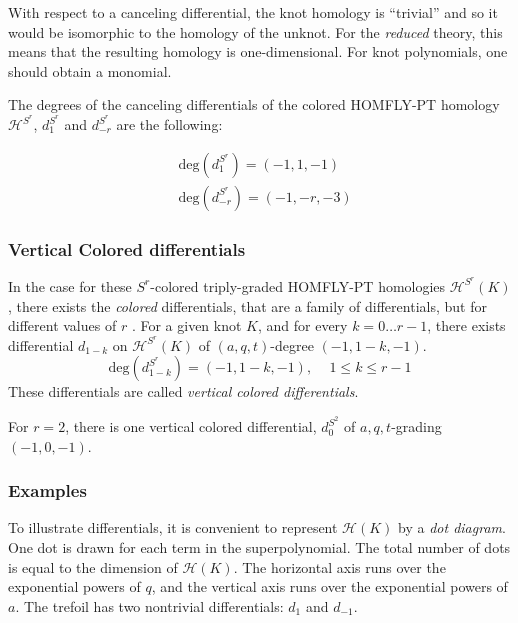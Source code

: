 \documentclass[a4paper,titlepage,twoside]{book}
\begin{document}
With respect to a canceling differential, the knot homology  is ``trivial'' and so it would be isomorphic to the homology of the unknot.  For the \emph{reduced} theory, this means that the resulting homology is one-dimensional.  For knot polynomials, one should obtain a monomial.

The degrees of the canceling differentials of the colored HOMFLY-PT homology $\mathcal{H}^{S^r}$, $d_1^{S^r}$ and $d^{S^r}_{-r}$ are the following:

\[
\begin{aligned}
  & \text{deg}{ (d_1^{S^r}) } = ( -1, 1, -1 ) \\ 
  & \text{deg}{ (d_{-r}^{S^r} ) } = (-1,-r,-3)
\end{aligned}
\]



\subsubsection{Vertical Colored differentials}

In the case for these $S^r$-colored triply-graded HOMFLY-PT homologies $\mathcal{H}^{S^r}{ (K)}$, there exists the \emph{colored} differentials, that are a family of differentials, but for different values of $r$ \cite{GukovStosic2012}.  For a given knot $K$, and for every $k=0 \dots r-1$, there exists differential $d_{1-k}$ on $\mathcal{H}^{ S^r}{ (K)}$ of $(a,q,t)$-degree $(-1,1-k,-1)$.  
\begin{equation}
  \text{deg}{ (d^{S^r}_{1-k}) } = (-1,1-k, -1), \quad \, 1 \leq k \leq r-1
\end{equation}
These differentials are called \emph{vertical colored differentials}.  

For $r=2$, there is one vertical colored differential, $d_0^{S^2}$ of $a,q,t$-grading $(-1,0,-1)$.  

\subsubsection{Examples}




To illustrate differentials, it is convenient to represent $\mathcal{H}{(K)}$ by a \emph{dot diagram}. One dot is drawn for each term in the superpolynomial.  The total number of dots is equal to the dimension of $\mathcal{H}{(K)}$.  The horizontal axis runs over the exponential powers of $q$, and the vertical axis runs over the exponential powers of $a$.  The trefoil has two nontrivial differentials: $d_1$ and $d_{-1}$.  
\end{document}
